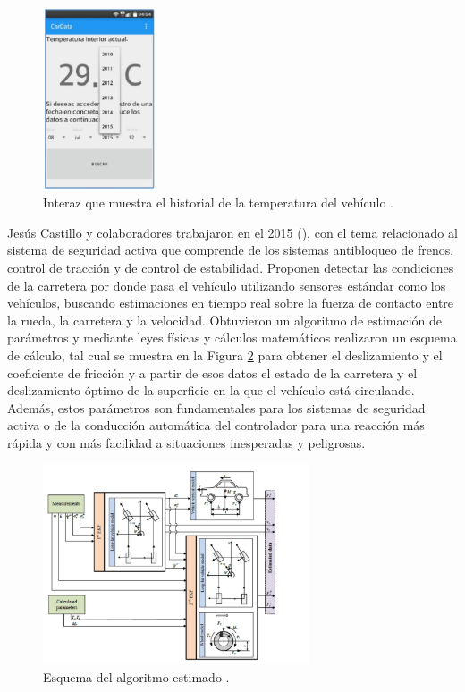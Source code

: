 %
\begin{figure}[H]
\centering
\includegraphics[width=0.3\textwidth]{introduccion/fig7.jpg}
\caption{Interaz que muestra el historial de la temperatura del vehículo \cite{UPS-08}. }
\label{Fcinco}
\end{figure}
%

Jesús Castillo y colaboradores trabajaron en el 2015 (\cite{UPS-10}), con el tema relacionado al sistema de seguridad activa que comprende de los sistemas antibloqueo de frenos, control de tracción y de control de estabilidad. Proponen detectar las condiciones de la carretera por donde pasa el vehículo utilizando sensores estándar como los vehículos, buscando estimaciones en tiempo real sobre la fuerza de contacto entre la rueda, la carretera y la velocidad. Obtuvieron un algoritmo de estimación de parámetros y mediante leyes físicas y cálculos matemáticos realizaron un esquema de cálculo, tal cual se muestra en la Figura \ref{Fcincodos} para obtener el deslizamiento y el coeficiente de fricción y a partir de esos datos el estado de la carretera y el deslizamiento óptimo de la superficie en la que el vehículo está circulando. Además, estos parámetros son fundamentales para los sistemas de seguridad activa o de la conducción automática del controlador para una reacción más rápida y con más facilidad a situaciones inesperadas y peligrosas.\\

%
\begin{figure}[H]
\centering
\includegraphics[width=0.7\textwidth]{introduccion/fig8.jpg}
\caption{Esquema del algoritmo estimado \cite{UPS-10}. }
\label{Fcincodos}
\end{figure}
%


